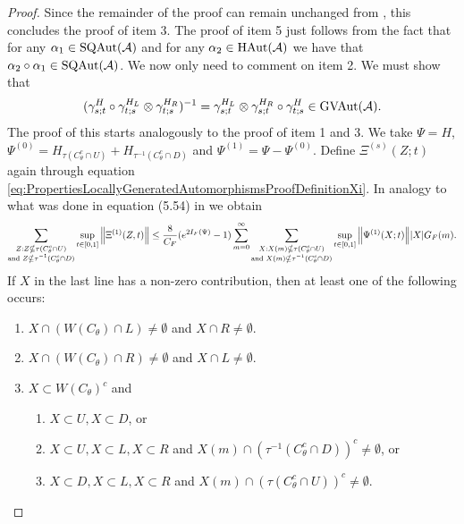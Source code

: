 \documentclass[12pt,a4paper,twoside]{article}
\numberwithin{equation}{section}
\begin{document}
\begin{proof}
	Since the remainder of the proof can remain unchanged from \cite{ogata2021h3gmathbb}, this concludes the proof of item 3. The proof of item 5 just follows from the fact that for any $\alpha_1\in\textrm{SQAut}(\AA)$ and for any $\alpha_2\in\textrm{HAut}(\AA)$ we have that $\alpha_2\circ\alpha_1\in\textrm{SQAut}(\AA)$. We now only need to comment on item 2. We must show that
	\begin{equation}
		(\gamma^H_{s;t}\circ\gamma^{H_L}_{t;s}\otimes\gamma^{H_R}_{t;s})^{-1}=\gamma^{H_L}_{s;t}\otimes\gamma^{H_R}_{s;t}\circ\gamma^H_{t;s}\in\textrm{GVAut}(\AA).
	\end{equation}
	The proof of this starts analogously to the proof of item 1 and 3. We take $\Psi=H$, $\Psi^{(0)}=H_{\tau(C_\theta^c\cap U)}+H_{\tau^{-1}(C_\theta^c\cap D)}$ and $\Psi^{(1)}=\Psi-\Psi^{(0)}$. Define $\Xi^{(s)}(Z;t)$ again through equation \eqref{eq:PropertiesLocallyGeneratedAutomorphismsProofDefinitionXi}. In analogy to what was done in equation (5.54) in \cite{ogata2021h3gmathbb} we obtain
	\begin{equation}
		\sum_{\substack{Z:Z\nsubseteq \tau(C_\theta^c\cap U)\\\text{and }Z\nsubseteq \tau^{-1}(C_\theta^c\cap D)}}\sup_{t\in[0,1]}\norm{\Xi^{(1)}(Z,t)}\leq \frac{8}{C_F}(e^{2I_F(\Psi)}-1)\sum_{m=0}^\infty\sum_{\substack{X:X(m)\nsubseteq \tau(C_\theta^c\cap U)\\\text{and }X(m)\nsubseteq \tau^{-1}(C_\theta^c\cap D)}} \sup_{t\in[0,1]}\norm{\Psi^{(1)}(X;t)}\abs{X}G_F(m).
	\end{equation}
	If $X$ in the last line has a non-zero contribution, then at least one of the following occurs:
	\begin{enumerate}
		\item $X\cap (W(C_\theta)\cap L)\neq\emptyset$ and $X\cap R\neq\emptyset$.
		\item $X\cap (W(C_\theta)\cap R)\neq\emptyset$ and $X\cap L\neq\emptyset$.
		\item $X\subset W(C_\theta)^c$ and
		\begin{enumerate}
			\item $X\subset U,X\subset D$, or
			\item $X\subset U,X\subset L,X\subset R$ and $X(m)\cap (\tau^{-1}(C_\theta^c\cap D))^c\neq \emptyset$, or
			\item $X\subset D,X\subset L,X\subset R$ and $X(m)\cap (\tau(C_\theta^c\cap U))^c\neq \emptyset$.
		\end{enumerate}
	\end{enumerate}

\end{proof}
\end{document}
